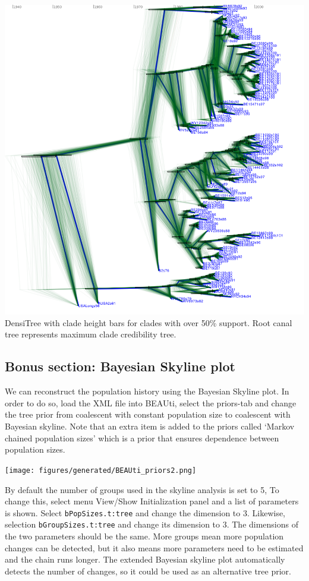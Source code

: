 \documentclass[12pt]{article}
\begin{document}
\includegraphics[width=\textwidth]{figures/DensiTree.pdf}
DensiTree with clade height bars for clades with over 50\% support.
Root canal tree represents maximum clade credibility tree.


\subsection*{Bonus section: Bayesian Skyline plot}

We can reconstruct the population history using the Bayesian Skyline plot. In order to do so,
load the XML file into BEAUti, select the priors-tab and change the tree prior from 
coalescent with constant population size to coalescent with Bayesian skyline.
Note that an extra item is added to the priors called `Markov chained population sizes'
which is a prior that ensures dependence between population sizes.

\begin{center}
\texttt{[image: figures/generated/BEAUti\_priors2.png]}
\end{center}

By default the number of groups used in the skyline analysis is set to 5, To change this,
select menu View/Show Initialization panel and a list of parameters is shown. Select
{\tt bPopSizes.t:tree} and change the dimension to 3. Likewise, selection {\tt bGroupSizes.t:tree}
and change its dimension to 3. The dimensions of the two parameters should be the same.
More groups mean more population changes can be detected, but it also means more parameters
need to be estimated and the chain runs longer. The extended Bayesian skyline plot
automatically detects the number of changes, so it could be used as an alternative
tree prior.
\end{document}
